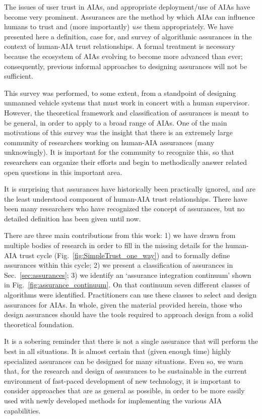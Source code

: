 The issues of user trust in AIAs, and appropriate deployment/use of AIAs have become very prominent.  Assurances are the method by which AIAs can influence humans to trust and (more importantly) \emph{use} them appropriately. We have presented here a definition, case for, and survey of algorithmic assurances in the context of human-AIA trust relationships. A formal treatment is necessary because the ecosystem of AIAs evolving to become more advanced than ever; consequently, previous informal approaches to designing assurances will not be sufficient.

This survey was performed, to some extent, from a standpoint of designing unmanned vehicle systems that must work in concert with a human supervisor. However, the theoretical framework and classification of assurances is meant to be general, in order to apply to a broad range of AIAs. One of the main motivations of this survey was the insight that there is an extremely large community of researchers working on human-AIA assurances (many unknowingly). It is important for the community to recognize this, so that researchers can organize their efforts and begin to methodically answer related open questions in this important area.

It is surprising that assurances have historically been practically ignored, and are the least understood component of human-AIA trust relationships. There have been many researchers who have recognized the concept of assurances, but no detailed definition has been given until now.

There are three main contributions from this work: 1) we have drawn from multiple bodies of research in order to fill in the missing details for the human-AIA trust cycle (Fig.~\ref{fig:SimpleTrust_one_way}) and to formally define assurances within this cycle; 2) we present a classification of assurances in Sec.~\ref{sec:assurances}; 3) we identify an `assurance integration continuum' shown in Fig.~\ref{fig:assurance_continuum}. On that continuum seven different classes of algorithms were identified. Practitioners can use these classes to select and design assurances for AIAs. In whole, given the material provided herein, those who design assurances should have the tools required to approach design from a solid theoretical foundation.

It is a sobering reminder that there is not a single assurance that will perform the best in all situations. It is almost certain that (given enough time) highly specialized assurances can be designed for many situations. Even so, we warn that, for the research and design of assurances to be sustainable in the current environment of fast-paced development of new technology, it is important to consider approaches that are as general as possible, in order to be more easily used with newly developed methods for implementing the various AIA capabilities.

